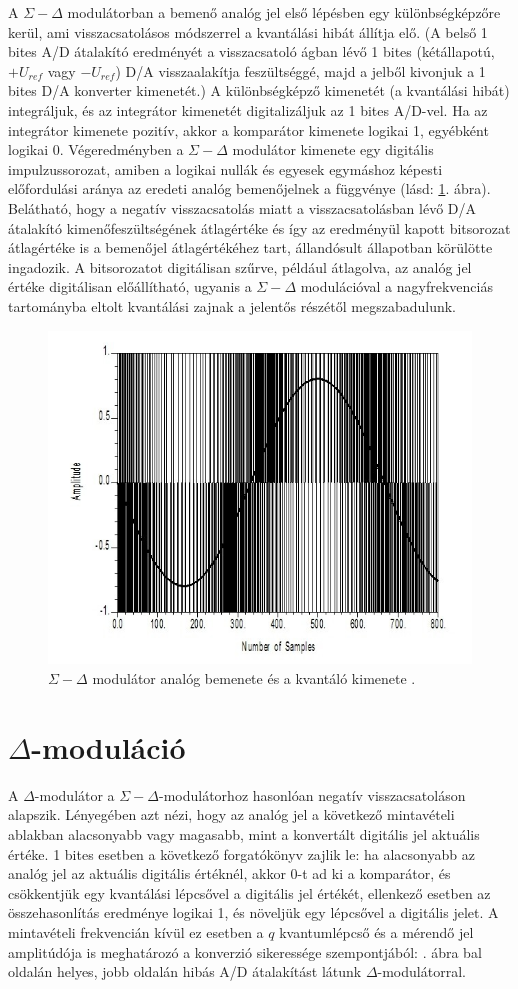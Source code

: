 \documentclass[12pt]{article}
\theoremstyle{plain}
\begin{document}
A $\Sigma-\Delta$ modulátorban a bemenő analóg jel első lépésben egy különbségképzőre kerül, ami visszacsatolásos módszerrel a kvantálási hibát állítja elő. (A belső 1 bites A/D átalakító eredményét a visszacsatoló ágban lévő 1 bites (kétállapotú, $+U_{ref}$ vagy $ - U_{ref}$) D/A visszaalakítja
feszültséggé, majd a jelből kivonjuk a  1 bites D/A konverter kimenetét.) A különbségképző kimenetét (a kvantálási hibát) integráljuk, és az integrátor kimenetét digitalizáljuk az 1 bites A/D-vel. Ha az integrátor kimenete pozitív, akkor a komparátor kimenete logikai 1, egyébként logikai 0. Végeredményben a $\Sigma-\Delta$ modulátor kimenete egy digitális impulzussorozat, amiben a logikai nullák és egyesek egymáshoz képesti előfordulási aránya az eredeti analóg
bemenőjelnek a függvénye (lásd: \ref{fig:sigmadeltamodulator}. ábra).
Belátható, hogy a negatív visszacsatolás miatt a visszacsatolásban lévő D/A átalakító kimenőfeszültségének átlagértéke és így az eredményül kapott bitsorozat
átlagértéke is a bemenőjel átlagértékéhez tart, állandósult állapotban körülötte ingadozik. A bitsorozatot digitálisan szűrve, például átlagolva, az analóg jel értéke digitálisan előállítható, ugyanis a $\Sigma-\Delta$ modulációval a nagyfrekvenciás tartományba eltolt kvantálási zajnak a jelentős részétől megszabadulunk.


\begin{figure}
	\centering
	\includegraphics[width=0.5\linewidth]{media/sigma_delta_modulator}
	\caption{$\Sigma-\Delta$ modulátor analóg bemenete és a kvantáló kimenete \cite{quora}.}
	\label{fig:sigmadeltamodulator}
\end{figure}


\section{$\Delta$-moduláció}

A $\Delta$-modulátor a $\Sigma-\Delta$-modulátorhoz hasonlóan negatív visszacsatoláson alapszik. Lényegében azt nézi, hogy az analóg jel a következő mintavételi ablakban alacsonyabb vagy magasabb, mint a konvertált digitális jel aktuális értéke. 1 bites esetben a következő forgatókönyv zajlik le: ha alacsonyabb az analóg jel az aktuális digitális értéknél, akkor 0-t ad ki a komparátor, és csökkentjük egy kvantálási lépcsővel a digitális jel értékét, ellenkező esetben az összehasonlítás eredménye logikai 1, és növeljük egy lépcsővel a digitális jelet. A mintavételi frekvencián kívül ez esetben a $q$ kvantumlépcső és a mérendő jel amplitúdója is meghatározó a konverzió sikeressége szempontjából: . ábra bal oldalán helyes, jobb oldalán hibás A/D átalakítást látunk $\Delta$-modulátorral. 
\end{document}
